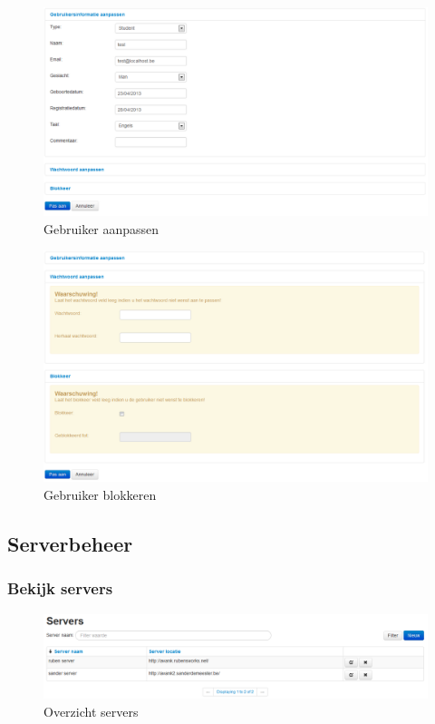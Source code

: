 \documentclass[]{article}
\begin{document}
\begin{figure}[!ht]
	\centering
	\includegraphics[width=1\textwidth]{img/edit_user}
	\caption{Gebruiker aanpassen}
	\label{edit_user}
\end{figure}

\begin{figure}[!ht]
	\centering
	\includegraphics[width=1\textwidth]{img/block_user}
	\caption{Gebruiker blokkeren}
	\label{block_user}
\end{figure}

\subsection{Serverbeheer}

\subsubsection{Bekijk servers}

\begin{figure}[!ht]
	\centering
	\includegraphics[width=1\textwidth]{img/server}
	\caption{Overzicht servers}
	\label{server}
\end{figure}
\end{document}
